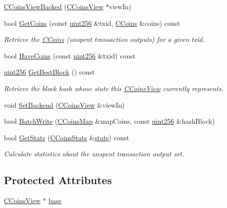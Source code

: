 \begin{DoxyCompactItemize}
\item 
\hyperlink{class_c_coins_view_backed_af86a3b07433e8d84678772411791125e}{C\+Coins\+View\+Backed} (\hyperlink{class_c_coins_view}{C\+Coins\+View} $\ast$view\+In)
\item 
bool \hyperlink{class_c_coins_view_backed_a21b95a9910f94e9b7ebed62a6f329ea0}{Get\+Coins} (const \hyperlink{classuint256}{uint256} \&txid, \hyperlink{class_c_coins}{C\+Coins} \&coins) const 
\begin{DoxyCompactList}\small\item\em Retrieve the \hyperlink{class_c_coins}{C\+Coins} (unspent transaction outputs) for a given txid. \end{DoxyCompactList}\item 
bool \hyperlink{class_c_coins_view_backed_a6a769cf9cc55128dea8e1a2798056e71}{Have\+Coins} (const \hyperlink{classuint256}{uint256} \&txid) const 
\item 
\hyperlink{classuint256}{uint256} \hyperlink{class_c_coins_view_backed_a8465dc4764fd5b01591b824551cbbfab}{Get\+Best\+Block} () const 
\begin{DoxyCompactList}\small\item\em Retrieve the block hash whose state this \hyperlink{class_c_coins_view}{C\+Coins\+View} currently represents. \end{DoxyCompactList}\item 
void \hyperlink{class_c_coins_view_backed_a7eaddfbfd401a95c2fda2a8d8feaaf73}{Set\+Backend} (\hyperlink{class_c_coins_view}{C\+Coins\+View} \&view\+In)
\item 
bool \hyperlink{class_c_coins_view_backed_ace15da3934c9d7a9cb9c7a787f92f764}{Batch\+Write} (\hyperlink{coins_8h_a2886ba2fd0428bae777e1cbcabc02834}{C\+Coins\+Map} \&map\+Coins, const \hyperlink{classuint256}{uint256} \&hash\+Block)
\item 
bool \hyperlink{class_c_coins_view_backed_a368f277ac68652a91ac171f46f02edca}{Get\+Stats} (\hyperlink{struct_c_coins_stats}{C\+Coins\+Stats} \&\hyperlink{db__bench_8cc_a5925d216740c89f43482df806fd14e8c}{stats}) const 
\begin{DoxyCompactList}\small\item\em Calculate statistics about the unspent transaction output set. \end{DoxyCompactList}\end{DoxyCompactItemize}
\subsection*{Protected Attributes}
\begin{DoxyCompactItemize}
\item 
\hyperlink{class_c_coins_view}{C\+Coins\+View} $\ast$ \hyperlink{class_c_coins_view_backed_a901472317114adc4c104efd61dcf6203}{base}
\end{DoxyCompactItemize}


